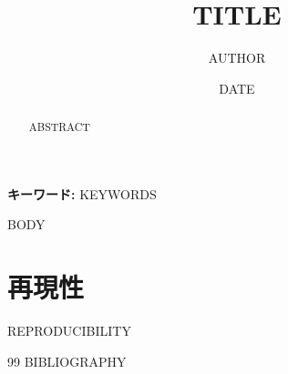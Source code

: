 \documentclass[paper=a4,fontsize=10.5pt,jafontsize=10.5pt]{jlreq}
\title{{{TITLE}}}
\author{{{AUTHOR}}}
\date{{{DATE}}}
\theoremstyle{plain}
\theoremstyle{definition}
\begin{document}
\maketitle

\begin{abstract}
{{ABSTRACT}}
\end{abstract}

\noindent\textbf{キーワード:} {{KEYWORDS}}

{{BODY}}

\section*{再現性}
{{REPRODUCIBILITY}}

\begin{thebibliography}{99}
{{BIBLIOGRAPHY}}
\end{thebibliography}
\end{document}

